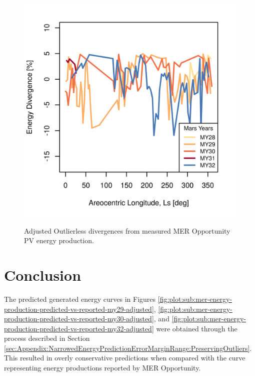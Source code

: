 \begin{figure}[h]
  \centering
  \hypersetup{linkcolor=captionTextColor}
  \includegraphics[width=0.8\linewidth]{sections/appendix/energy-error-margin/plots/energy-prediction-divergences-from-my28-to-my32-adjusted-without-outliers.png}\\
  \caption[Adjusted Outlierless divergences from measured \ac{MER} Opportunity PV energy production]
          {Adjusted Outlierless divergences from measured \ac{MER} Opportunity PV energy production.}
  \label{fig:plot:mer-energy-prediction-divergences-adjusted-without-outliers}
\end{figure}

\clearpage

\section{Conclusion}
\label{sec:Appendix:NarrowedEnergyPredictionErrorMarginRange:Conclusion}

The predicted generated energy curves in Figures \ref{fig:plot:sub:mer-energy-production-predicted-vs-reported-my29-adjusted}, \ref{fig:plot:sub:mer-energy-production-predicted-vs-reported-my30-adjusted}, and \ref{fig:plot:sub:mer-energy-production-predicted-vs-reported-my32-adjusted} were obtained through the process described in Section \ref{sec:Appendix:NarrowedEnergyPredictionErrorMarginRange:PreservingOutliers}. This resulted in overly conservative predictions when compared with the curve representing energy productions reported by MER Opportunity.

